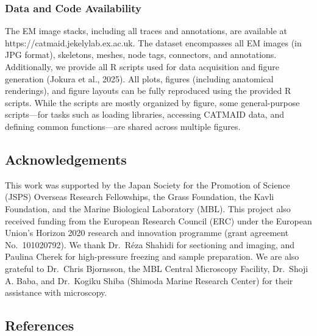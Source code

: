 \documentclass[
  11pt,
]{article}
\begin{document}
\subsubsection{Data and Code
Availability}\label{data-and-code-availability}

The EM image stacks, including all traces and annotations, are available
at https://catmaid.jekelylab.ex.ac.uk. The dataset encompasses all EM
images (in JPG format), skeletons, meshes, node tags, connectors, and
annotations. Additionally, we provide all R scripts used for data
acquisition and figure generation (Jokura et al., 2025). All plots,
figures (including anatomical renderings), and figure layouts can be
fully reproduced using the provided R scripts. While the scripts are
mostly organized by figure, some general-purpose scripts---for tasks
such as loading libraries, accessing CATMAID data, and defining common
functions---are shared across multiple figures.

\subsection{Acknowledgements}\label{acknowledgements}

This work was supported by the Japan Society for the Promotion of
Science (JSPS) Overseas Research Fellowships, the Grass Foundation, the
Kavli Foundation, and the Marine Biological Laboratory (MBL). This
project also received funding from the European Research Council (ERC)
under the European Union's Horizon 2020 research and innovation
programme (grant agreement No.~101020792). We thank Dr.~Réza Shahidi for
sectioning and imaging, and Paulina Cherek for high-pressure freezing
and sample preparation. We are also grateful to Dr.~Chris Bjornsson, the
MBL Central Microscopy Facility, Dr.~Shoji A. Baba, and Dr.~Kogiku Shiba
(Shimoda Marine Research Center) for their assistance with microscopy.

\subsection*{References}\label{references}
\end{document}
